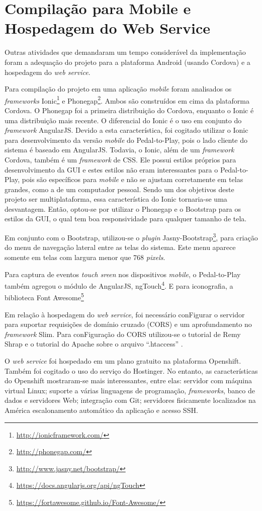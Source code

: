 \section{Compilação para Mobile e Hospedagem do Web Service}
Outras atividades que demandaram um tempo considerável da implementação foram a adequação do projeto para a plataforma Android (usando Cordova) e a hospedagem do \textit{web service}.
\par
Para compilação do projeto em uma aplicação \textit{mobile} foram analisados os \textit{frameworks} Ionic\footnote{\url{http://ionicframework.com/}} e Phonegap\footnote{\url{http://phonegap.com/}}. Ambos são construídos em cima da plataforma Cordova. O Phonegap foi a primeira distribuição do Cordova, enquanto o Ionic é uma distribuição mais recente. O diferencial do Ionic é o uso em conjunto do \textit{framework} AngularJS. Devido a esta característica, foi cogitado utilizar o Ionic para desenvolvimento da versão \textit{mobile} do Pedal-to-Play, pois o lado cliente do sistema é baseado em AngularJS. Todavia, o Ionic, além de um \textit{framework} Cordova, também é um \textit{framework} de CSS. Ele possui estilos próprios para desenvolvimento da GUI e estes estilos não eram interessantes para o Pedal-to-Play, pois são específicos para \textit{mobile} e não se ajustam corretamente em telas grandes, como a de um computador pessoal. Sendo um dos objetivos deste projeto ser multiplataforma, essa característica do Ionic tornaria-se uma desvantagem. Então, optou-se por utilizar o Phonegap e o Bootstrap para os estilos da GUI, o qual tem boa responsividade para qualquer tamanho de tela. 
\par
Em conjunto com o Bootstrap, utilizou-se o \textit{plugin} Jasny-Bootstrap\footnote{\url{http://www.jasny.net/bootstrap/}}, para criação do menu de navegação lateral entre as telas do sistema. Este menu aparece somente em telas com largura menor que 768 \textit{pixels}. 
\par
Para captura de eventos \textit{touch sreen} nos dispositivos \textit{mobile}, o Pedal-to-Play também agregou o módulo de AngularJS, ngTouch\footnote{\url{https://docs.angularjs.org/api/ngTouch}}. E para iconografia, a biblioteca Font Awesome\footnote{\url{https://fortawesome.github.io/Font-Awesome/}} 
\par
Em relação à hospedagem do \textit{web service}, foi necessário conFigurar o servidor para suportar requisições de domínio cruzado (CORS) e um aprofundamento no \textit{framework} Slim. Para conFiguração do CORS utilizou-se o tutorial de Remy Shrap \citeyearpar{remyCors} e o tutorial do Apache sobre o arquivo “.htaccess” \citeyearpar{htaccess}.
\par
O \textit{web service} foi hospedado em um plano gratuito na plataforma Openshift. Também foi cogitado o uso do serviço do Hostinger. No entanto, as características do Openshift mostraram-se mais interessantes, entre elas: servidor com máquina virtual Linux; suporte a várias linguagens de programação, \textit{frameworks}, banco de dados e servidores Web; integração com Git; servidores fisicamente localizados na América escalonamento automático da aplicação e acesso SSH.

